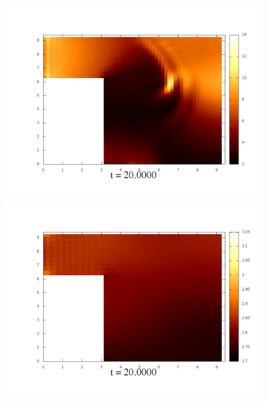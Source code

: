 \documentclass[a4paper, 12pt]{article}
\begin{document}
\begin{figure}[h]
	\begin{minipage}[h]{0.4\linewidth}
		\includegraphics[width=1\linewidth]{./img/01_1_1/G/100}
	\end{minipage}
	\hfill
	\begin{minipage}[h]{0.4\linewidth}
		\includegraphics[width=1\linewidth]{./img/01_1_01/G/100}
	\end{minipage}
\end{figure}
\end{document}
